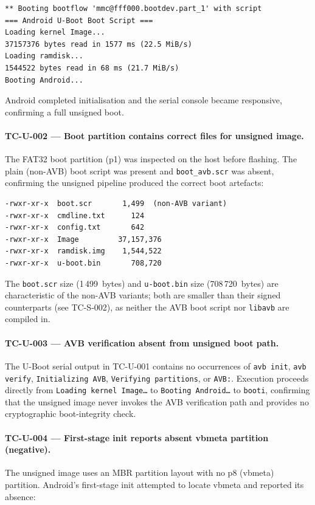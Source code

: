 \begin{lstlisting}[caption={TC-U-001: U-Boot output on unsigned image}]
** Booting bootflow 'mmc@fff000.bootdev.part_1' with script
=== Android U-Boot Boot Script ===
Loading kernel Image...
37157376 bytes read in 1577 ms (22.5 MiB/s)
Loading ramdisk...
1544522 bytes read in 68 ms (21.7 MiB/s)
Booting Android...
\end{lstlisting}

Android completed initialisation and the serial console became responsive, confirming a full unsigned boot.

\paragraph{TC-U-002 --- Boot partition contains correct files for unsigned image.}
The FAT32 boot partition (p1) was inspected on the host before flashing. The plain (non-AVB) boot script was present and \texttt{boot\_avb.scr} was absent, confirming the unsigned pipeline produced the correct boot artefacts:

\begin{lstlisting}[caption={TC-U-002: Boot partition file listing --- unsigned image}]
-rwxr-xr-x  boot.scr       1,499  (non-AVB variant)
-rwxr-xr-x  cmdline.txt      124
-rwxr-xr-x  config.txt       642
-rwxr-xr-x  Image         37,157,376
-rwxr-xr-x  ramdisk.img    1,544,522
-rwxr-xr-x  u-boot.bin       708,720
\end{lstlisting}

The \texttt{boot.scr} size (1\,499~bytes) and \texttt{u-boot.bin} size (708\,720~bytes) are characteristic of the non-AVB variants; both are smaller than their signed counterparts (see TC-S-002), as neither the AVB boot script nor \texttt{libavb} are compiled in.

\paragraph{TC-U-003 --- AVB verification absent from unsigned boot path.}
The U-Boot serial output in TC-U-001 contains no occurrences of \texttt{avb init}, \texttt{avb verify}, \texttt{Initializing AVB}, \texttt{Verifying partitions}, or \texttt{AVB:}.  Execution proceeds directly from \texttt{Loading kernel Image\ldots} to \texttt{Booting Android\ldots} to \texttt{booti}, confirming that the unsigned image never invokes the AVB verification path and provides no cryptographic boot-integrity check.

\paragraph{TC-U-004 --- First-stage init reports absent vbmeta partition (negative).}
The unsigned image uses an MBR partition layout with no p8 (vbmeta) partition.  Android's first-stage init attempted to locate vbmeta and reported its absence:

